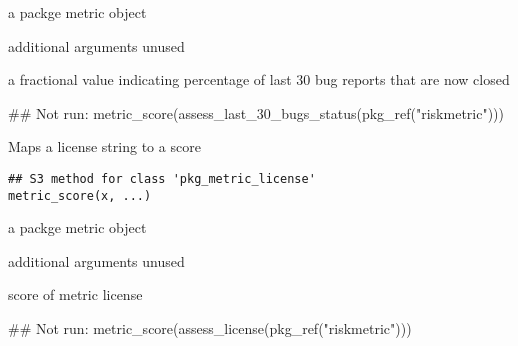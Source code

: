 \documentclass[a4paper]{book}
\begin{document}
%
\begin{Arguments}
\begin{ldescription}
\item[\code{x}] a  packge metric object

\item[\code{...}] additional arguments unused
\end{ldescription}
\end{Arguments}
%
\begin{Value}
a fractional value indicating percentage of last 30 bug reports that
are now closed
\end{Value}
%
\begin{Examples}
\begin{ExampleCode}
## Not run: metric_score(assess_last_30_bugs_status(pkg_ref("riskmetric")))

\end{ExampleCode}
\end{Examples}
%
\begin{Description}
Maps a license string to a score
\end{Description}
%
\begin{Usage}
\begin{verbatim}
## S3 method for class 'pkg_metric_license'
metric_score(x, ...)
\end{verbatim}
\end{Usage}
%
\begin{Arguments}
\begin{ldescription}
\item[\code{x}] a  packge metric object

\item[\code{...}] additional arguments unused
\end{ldescription}
\end{Arguments}
%
\begin{Value}
score of metric license
\end{Value}
%
\begin{Examples}
\begin{ExampleCode}
## Not run: metric_score(assess_license(pkg_ref("riskmetric")))

\end{ExampleCode}
\end{Examples}
\end{document}
